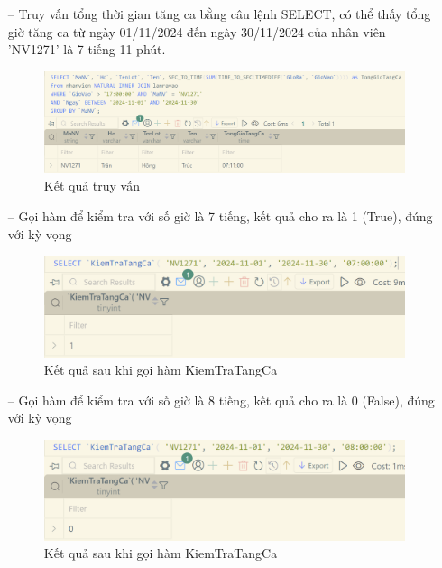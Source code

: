 \begin{itemize}
    \item [--] Truy vấn tổng thời gian tăng ca bằng câu lệnh SELECT, có thể thấy tổng giờ tăng ca từ ngày 01/11/2024 đến ngày 30/11/2024 của nhân viên 'NV1271' là 7 tiếng 11 phút.
    \begin{figure}[H]
        \centering
        \includegraphics[width=\linewidth]{content/images/func_2_1.png}
        \caption{Kết quả truy vấn}
        \label{fig:func_2_1}
    \end{figure}
    \item [--] Gọi hàm để kiểm tra với số giờ là 7 tiếng, kết quả cho ra là 1 (True), đúng với kỳ vọng
    \begin{figure}[H]
        \centering
        \includegraphics[width=\linewidth]{content/images/func_2_2.png}
        \caption{Kết quả sau khi gọi hàm KiemTraTangCa}
        \label{fig:func_2_2}
    \end{figure}
    \item [--] Gọi hàm để kiểm tra với số giờ là 8 tiếng, kết quả cho ra là 0 (False), đúng với kỳ vọng
    \begin{figure}[H]
        \centering
        \includegraphics[width=\linewidth]{content/images/func_2_3.png}
        \caption{Kết quả sau khi gọi hàm KiemTraTangCa}
        \label{fig:func_2_3}
    \end{figure}
\end{itemize}
\newpage